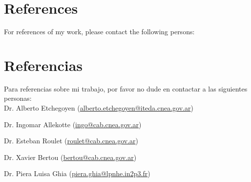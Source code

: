 \ifeng
\section*{References}

For references of my work, please contact the following persons:\\
\else
\section*{Referencias}

Para referencias sobre mi trabajo, por favor no dude en contactar a las siguientes personas:\\

\fi
Dr. Alberto Etchegoyen (\href{mailto:alberto.etchegoyen@iteda.cnea.gov.ar}{alberto.etchegoyen@iteda.cnea.gov.ar})

Dr. Ingomar Allekotte (\href{mailto:ingo@cab.cnea.gov.ar}{ingo@cab.cnea.gov.ar})

Dr. Esteban Roulet (\href{mailto:roulet@cab.cnea.gov.ar}{roulet@cab.cnea.gov.ar})

Dr. Xavier Bertou (\href{mailto:bertou@cab.cnea.gov.ar}{bertou@cab.cnea.gov.ar})

Dr. Piera Luisa Ghia (\href{mailto:piera.ghia@lpnhe.in2p3.fr}{piera.ghia@lpnhe.in2p3.fr})
